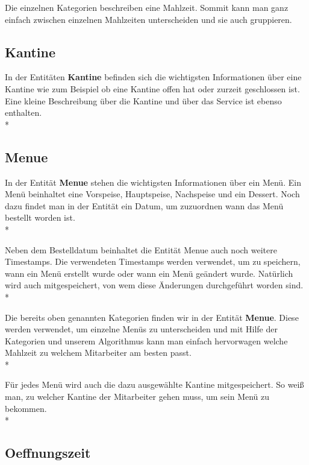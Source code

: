 Die einzelnen Kategorien beschreiben eine Mahlzeit. Sommit kann man ganz einfach zwischen einzelnen Mahlzeiten unterscheiden und sie auch gruppieren.


\subsection{Kantine}

In der Entitäten \textbf{Kantine} befinden sich die wichtigsten Informationen über eine Kantine wie zum Beispiel ob eine Kantine offen hat oder zurzeit geschlossen ist. 
Eine kleine Beschreibung über die Kantine und über das Service ist ebenso enthalten. \\*

\pagebreak

\subsection{Menue}

In der Entität \textbf{Menue} stehen die wichtigsten Informationen über ein Menü. Ein Menü beinhaltet eine Vorspeise, Hauptspeise, Nachspeise und ein Dessert. 
Noch dazu findet man in der Entität ein Datum, um zuzuordnen wann das Menü bestellt worden ist. \\*

Neben dem Bestelldatum beinhaltet die Entität Menue auch noch weitere Timestamps.
Die verwendeten Timestamps werden verwendet, um zu speichern, wann ein Menü erstellt wurde oder wann ein Menü geändert wurde. 
Natürlich wird auch mitgespeichert, von wem diese Änderungen durchgeführt worden sind. \\*


Die bereits oben genannten Kategorien finden wir in der Entität \textbf{Menue}. 
Diese werden verwendet, um einzelne Menüs zu unterscheiden und mit Hilfe der Kategorien und unserem Algorithmus kann man einfach hervorwagen welche Mahlzeit zu welchem Mitarbeiter am besten passt. \\*

Für jedes Menü wird auch die dazu ausgewählte Kantine mitgespeichert. So weiß man, zu welcher Kantine der Mitarbeiter gehen muss, um sein Menü zu bekommen. \\*



\subsection{Oeffnungszeit}

